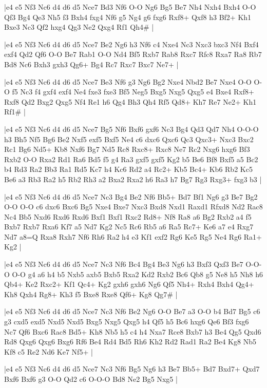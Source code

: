 \whitename{}
\blackname{}
\makegametitle
|e4 e5 Nf3 Nc6 d4 d6 d5 Nce7 Bd3 Nf6 O-O Ng6 Bg5 Be7 Nh4 Nxh4 Bxh4 O-O Qf3 Bg4 Qe3 Nh5 f3 Bxh4 fxg4 Nf6 g5 Ng4 g6 fxg6 Rxf8+ Qxf8 h3 Bf2+ Kh1 Bxe3 Nc3 Qf2 hxg4 Qg3 Ne2 Qxg4 Rf1 Qh4\#  |

\whitename{}
\blackname{}
\makegametitle
|e4 e5 Nf3 Nc6 d4 d6 d5 Nce7 Be2 Ng6 h3 Nf6 c4 Nxe4 Nc3 Nxc3 bxc3 Nf4 Bxf4 exf4 Qd2 Qf6 O-O Be7 Rab1 O-O Nd4 Bf5 Rxb7 Rab8 Rxc7 Rfc8 Rxa7 Ra8 Rb7 Bd8 Nc6 Bxh3 gxh3 Qg6+ Bg4 Rc7 Rxc7 Bxc7 Ne7+  |

\whitename{}
\blackname{}
\makegametitle
|e4 e5 Nf3 Nc6 d4 d6 d5 Nce7 Be3 Nf6 g3 Ng6 Bg2 Nxe4 Nbd2 Be7 Nxe4 O-O O-O f5 Nc3 f4 gxf4 exf4 Ne4 fxe3 fxe3 Bf5 Neg5 Bxg5 Nxg5 Qxg5 e4 Bxe4 Rxf8+ Rxf8 Qd2 Bxg2 Qxg5 Nf4 Re1 h6 Qg4 Bh3 Qh4 Rf5 Qd8+ Kh7 Re7 Ne2+ Kh1 Rf1\#  |

\whitename{}
\blackname{}
\makegametitle
|e4 e5 Nf3 Nc6 d4 d6 d5 Nce7 Bg5 Nf6 Bxf6 gxf6 Nc3 Bg4 Qd3 Qd7 Nh4 O-O-O h3 Bh5 Nf5 Bg6 Be2 Nxf5 exf5 Bxf5 Ne4 c6 dxc6 Qxc6 Qc3 Qxc3+ Nxc3 Bxc2 Rc1 Bg6 Nd5+ Kb8 Nxf6 Bg7 Nd5 Rc8 Rxc8+ Rxc8 Ne7 Rc2 Nxg6 hxg6 Bf3 Rxb2 O-O Rxa2 Rd1 Ra6 Bd5 f5 g4 Ra3 gxf5 gxf5 Kg2 b5 Be6 Bf8 Bxf5 a5 Bc2 b4 Rd3 Ra2 Bb3 Ra1 Rd5 Kc7 h4 Kc6 Rd2 a4 Rc2+ Kb5 Bc4+ Kb6 Rb2 Kc5 Be6 a3 Rb3 Ra2 h5 Rb2 Rh3 a2 Bxa2 Rxa2 h6 Ra3 h7 Bg7 Rg3 Rxg3+ fxg3 b3  |

\whitename{}
\blackname{}
\makegametitle
|e4 e5 Nf3 Nc6 d4 d6 d5 Nce7 Nc3 Bg4 Be2 Nf6 Bb5+ Bd7 Bf1 Ng6 g3 Be7 Bg2 O-O O-O c6 dxc6 Bxc6 Bg5 Nxe4 Bxe7 Nxc3 Bxd8 Nxd1 Raxd1 Rfxd8 Nd2 Rac8 Nc4 Bb5 Nxd6 Rxd6 Rxd6 Bxf1 Bxf1 Rxc2 Rd8+ Nf8 Ra8 a6 Bg2 Rxb2 a4 f5 Bxb7 Rxb7 Rxa6 Kf7 a5 Nd7 Kg2 Nc5 Rc6 Rb5 a6 Ra5 Rc7+ Ke6 a7 e4 Rxg7 Nd7 a8=Q Rxa8 Rxh7 Nf6 Rh6 Ra2 h4 e3 Kf1 exf2 Rg6 Ke5 Rg5 Ne4 Rg6 Ra1+ Kg2  |

\whitename{}
\blackname{}
\makegametitle
|e4 e5 Nf3 Nc6 d4 d6 d5 Nce7 Nc3 Nf6 Bc4 Bg4 Be3 Ng6 h3 Bxf3 Qxf3 Be7 O-O-O O-O g4 a6 h4 b5 Nxb5 axb5 Bxb5 Rxa2 Kd2 Rxb2 Bc6 Qb8 g5 Ne8 h5 Nh8 h6 Qb4+ Ke2 Rxc2+ Kf1 Qc4+ Kg2 gxh6 gxh6 Ng6 Qf5 Nh4+ Rxh4 Bxh4 Qg4+ Kh8 Qxh4 Rg8+ Kh3 f5 Bxe8 Rxe8 Qf6+ Kg8 Qg7\#  |

\whitename{}
\blackname{}
\makegametitle
|e4 e5 Nf3 Nc6 d4 d6 d5 Nce7 Nc3 Nf6 Be2 Ng6 O-O Be7 a3 O-O b4 Bd7 Bg5 c6 g3 cxd5 exd5 Nxd5 Nxd5 Bxg5 Nxg5 Qxg5 h4 Qf5 h5 Bc6 hxg6 Qe6 Bf3 fxg6 Nc7 Qf6 Bxc6 Rac8 Bd5+ Kh8 Nb5 h5 c4 h4 Nxa7 Rce8 Bxb7 h3 Be4 Qg5 Qxd6 Rd8 Qxg6 Qxg6 Bxg6 Rf6 Be4 Rd4 Bd5 Rh6 Kh2 Rd2 Rad1 Ra2 Be4 Kg8 Nb5 Kf8 c5 Re2 Nd6 Ke7 Nf5+  |

\whitename{}
\blackname{}
\makegametitle
|e4 e5 Nf3 Nc6 d4 d6 d5 Nce7 Nc3 Nf6 Bg5 Ng6 h3 Be7 Bb5+ Bd7 Bxd7+ Qxd7 Bxf6 Bxf6 g3 O-O Qd2 c6 O-O-O Bd8 Ne2 Bg5 Nxg5  |

